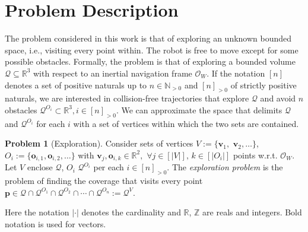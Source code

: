 \documentclass[letterpaper,10pt,conference,twoside]{IEEEtran}
\theoremstyle{definition}
\newtheorem*{pb}{Problem}%
\begin{document}


\section{Problem Description}
\label{sec:pf}
\noindent
The problem considered in this work %
is that of exploring an unknown bounded space, i.e., visiting %
every point %
within.
The robot is free to move except for %
some possible obstacles.
Formally, the problem 
is that of exploring a bounded volume $\mathcal{Q}\subseteq\mathbb{R}^3$ with respect to an inertial navigation frame $\mathcal{O}_W$. If the notation $[n]$ denotes a set of positive naturals up to $n\in\mathbb{N}_{>0}$ and $[n]_{>0}$ of strictly positive naturals, we are interested in collision-free trajectories that explore $\mathcal{Q}$ and avoid $n$ obstacles $\mathcal{Q}^{O_i}\subset\mathbb{R}^3,i\in[n]_{>0}$. We can approximate the space that delimits $\mathcal{Q}$ and $\mathcal{Q}^{O_i}$ for each $i$ with a set of vertices within which the two sets are contained.

\begin{pb}[Exploration]
  Consider sets of vertices $V:=\{\mathbf{v}_1,$ $\mathbf{v}_2,\dots\}$, $O_i:=\{\mathbf{o}_{i,1},\mathbf{o}_{i,2},\dots\}$ with $\mathbf{v}_j,\mathbf{o}_{i,k}\in\mathbb{R}^2,$ $\forall j\in[|V|],\,k\in[|O_i|]$ points w.r.t. $\mathcal{O}_W$. Let $V$ enclose $\mathcal{Q}$, $O_i$ $\mathcal{Q}^{O_i}$ per each $i\in[n]_{>0}$. The \textit{exploration problem} is the problem of finding the coverage that visits %
  every point $\mathbf{p}\in\mathcal{Q}\cap\mathcal{Q}^{O_1}\cap\mathcal{Q}^{O_2}\cap\cdots\cap\mathcal{Q}^{O_n}:=\mathcal{Q}^V$.
\end{pb}

Here the notation $|\cdot|$ denotes the cardinality and $\mathbb{R}$, $\mathbb{Z}$ are reals and integers. Bold notation is used for vectors.
\end{document}
